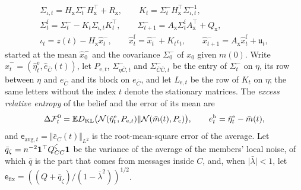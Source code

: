 \begin{equation}\label{eq:apx-level0-filter}
\begin{gathered}
\Sigma_{\iota,t}=H_{\mathrm x}\Sigma^-_tH_{\mathrm x}^\top+R_{\mathrm x},\qquad K_t=\Sigma^-_tH_{\mathrm x}^\top\Sigma_{\iota,t}^{-1},\\
\Sigma^{\mathrm f}_t=\Sigma^-_t-K_t\Sigma_{\iota,t}K_t^\top,\qquad\Sigma^-_{t+1}=A_{\mathrm x}\Sigma^{\mathrm f}_tA_{\mathrm x}^\top+Q_{\mathrm x},\\
\iota_t=z(t)-H_{\mathrm x}\hat x^-_t,\qquad\hat x^{\mathrm f}_t=\hat x^-_t+K_t\iota_t,\qquad\hat x^-_{t+1}=A_{\mathrm x}\hat x^{\mathrm f}_t+\mathfrak u_t,
\end{gathered}
\end{equation}
started at the mean $\hat x^-_0$ and the covariance $\Sigma^-_0$ of $x_0$ given $m(0)$. Write $\hat x^-_t=(\hat\eta^{\mathrm e}_t,\hat e_{\bar C}(t))$, let $P_{\mathrm e,t}$, $\Sigma^-_{\eta\bar C,t}$ and $\Sigma^-_{\bar C\bar C,t}$ be the entry of $\Sigma^-_t$ on $\eta$, its row between $\eta$ and $e_{\bar C}$ and its block on $e_{\bar C}$, and let $L_{\mathrm e,t}$ be the row of $K_t$ on $\eta$; the same letters without the index $t$ denote the stationary matrices. The \emph{excess relative entropy} of the belief and the error of its mean are
\begin{equation*}
\Delta\mathcal F^0_t=\mathbb{E}D_{\mathrm{KL}}\bigl(\mathcal{N}(\hat\eta^{\mathrm e}_t,P_{\mathrm e,t})\Vert\mathcal{N}(\bar m(t),P_{\mathrm c})\bigr),\qquad e^{\mathrm b}_t=\hat\eta^{\mathrm e}_t-\bar m(t),
\end{equation*}
and $\mathsf e_{\mathrm{avg},t}=\Vert\bar e_C(t)\Vert_{L^2}$ is the root-mean-square error of the average. Let $\bar q_\zeta=n^{-2}\mathbf{1}^\top Q^\zeta_{CC}\mathbf{1}$ be the variance of the average of the members' local noise, of which $\bar q$ is the part that comes from messages inside $C$, and, when $\lvert\bar\lambda\rvert<1$, let $\mathsf e_{\mathrm{fix}}=((Q+\bar q_\zeta)/(1-\bar\lambda^2))^{1/2}$.

